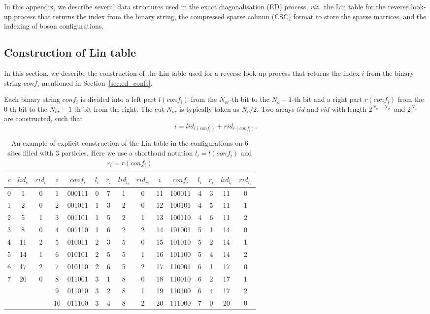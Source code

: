 \documentclass{timesjhep}
\begin{document}
In this appendix, we describe several data structures used in the exact diagonalisation (ED) process, \textit{viz.}~the Lin table for the reverse look-up process that returns the index from the binary string, the compressed sparse column (CSC) format to store the sparse matrices, and the indexing of boson configurations. 

\subsection{Construction of Lin table}
\label{app:data_lin}

In this section, we describe the construction of the Lin table used for a reverse look-up process that returns the index $i$ from the binary string $conf_i$ mentioned in Section~\ref{sec:ed_confs}. 

Each binary string $conf_i$ is divided into a left part $l(conf_i)$ from the $N_{or}$-th bit to the $N_o-1$-th bit and a right part $r(conf_i)$ from the $0$-th bit to the $N_{or}-1$-th bit from the right. The cut $N_{or}$ is typically taken as $N_o/2$. Two arrays $lid$ and $rid$ with length $2^{N_o-N_{or}}$ and $2^{N_{or}}$ are constructed, such that 
\begin{equation}
    i=lid_{l(conf_i)}+rid_{r(conf_i)}.
\end{equation}

\begin{table}[hbtp]
    \centering
    \begin{tabular}{ccc|cccccc|cccccc}
        \hline\hline
        $c$&$lid_c$&$rid_c$&$i$&$conf_i$&$l_i$&$r_i$&$lid_{l_i}$&$rid_{r_i}$&$i$&$conf_i$&$l_i$&$r_i$&$lid_{l_i}$&$rid_{r_i}$\\
        \hline
        0& 1&0& 1&000111&0&7&1&0&11&100011&4&3&11&0\\
        1& 2&0& 2&001011&1&3&2&0&12&100101&4&5&11&1\\
        2& 5&1& 3&001101&1&5&2&1&13&100110&4&6&11&2\\
        3& 8&0& 4&001110&1&6&2&2&14&101001&5&1&14&0\\
        4&11&2& 5&010011&2&3&5&0&15&101010&5&2&14&1\\
        5&14&1& 6&010101&2&5&5&1&16&101100&5&4&14&2\\
        6&17&2& 7&010110&2&6&5&2&17&110001&6&1&17&0\\
        7&20&0& 8&011001&3&1&8&0&18&110010&6&2&17&1\\
         &  & & 9&011010&3&2&8&1&19&110100&6&4&17&2\\
         &  & &10&011100&3&4&8&2&20&111000&7&0&20&0\\
        \hline\hline
    \end{tabular}
    \caption{An example of explicit construction of the Lin table in the configurations on 6 sites filled with 3 particles. Here we use a shorthand notation $l_i=l(conf_i)$ and $r_i=r(conf_i)$}
    \label{tbl:lin_eg}
\end{table}
\end{document}
